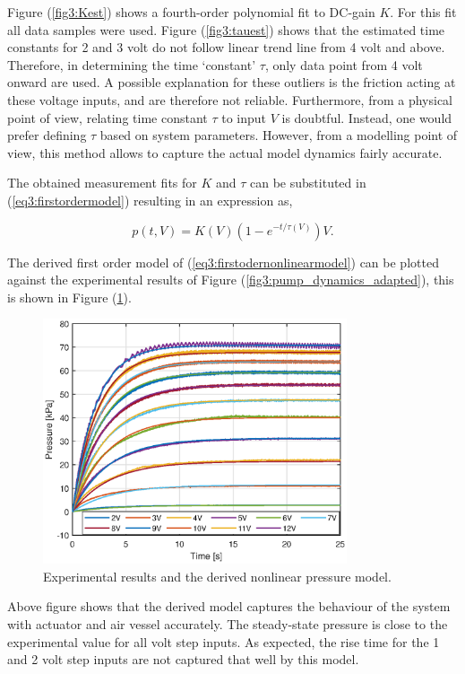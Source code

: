 Figure (\ref{fig3:Kest}) shows a fourth-order polynomial fit to DC-gain $K$. For this fit all data samples were used. Figure (\ref{fig3:tauest}) shows that the estimated time constants for 2 and 3 volt do not follow linear trend line from 4 volt and above. Therefore, in determining the time `constant' $\tau$, only data point from 4 volt onward are used. A possible explanation for these outliers is the friction acting at these voltage inputs, and are therefore not reliable. Furthermore, from a physical point of view, relating time constant $\tau$ to input $V$ is doubtful. Instead, one would prefer defining $\tau$ based on system parameters. However, from a modelling point of view, this method allows to capture the actual model dynamics fairly accurate.

The obtained measurement fits for $K$ and $\tau$ can be substituted in (\ref{eq3:firstordermodel}) resulting in an expression as,

\begin{equation}
    p(t,V) = K(V)(1-e^{-t/\tau(V)})V.
    \label{eq3:firstodernonlinearmodel}
    \end{equation}

The derived first order model of (\ref{eq3:firstodernonlinearmodel}) can be plotted against the experimental results of Figure (\ref{fig3:pump_dynamics_adapted}), this is shown in Figure (\ref{fig3:expvsfitpres}).

\begin{figure}[H]
    \centering
    \includegraphics[width = 0.8\textwidth]{Figures/Chapter3/expfit.eps}
    \caption{Experimental results and the derived nonlinear pressure model.}
    \label{fig3:expvsfitpres}
\end{figure}

Above figure shows that the derived model captures the behaviour of the system with actuator and air vessel accurately. The steady-state pressure is close to the experimental value for all volt step inputs. As expected, the rise time for the 1 and 2 volt step inputs are not captured that well by this model.


